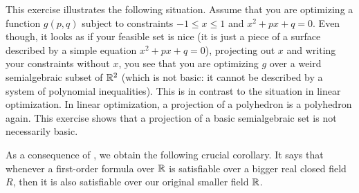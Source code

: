 \begin{solution}
\begin{center}
	\end{center}
\end{solution}

	This exercise illustrates the following situation. Assume that you are optimizing a function $g(p,q)$ subject to constraints $-1 \le x \le 1$ and $x^2 + p x + q =0$. Even though, it looks as if your feasible set is nice (it is just a piece of a surface described by a simple equation $x^2 + p x + q =0$), projecting out $x$ and writing your constraints without $x$, you see that you are optimizing $g$ over a weird semialgebraic subset of $\mathbb{R}^2$ (which is not basic: it cannot be described by a system of polynomial inequalities). This is in contrast to the situation in linear optimization. In linear optimization, a projection of a polyhedron is a polyhedron again. This exercise shows that a projection of a basic semialgebraic set is not necessarily basic. 

As a consequence of , we obtain the following crucial corollary. It says that whenever a first-order formula over $\mathbb{R}$ is satisfiable over a bigger real closed field $R$, then it is also satisfiable over our original smaller field $\mathbb{R}$. 


